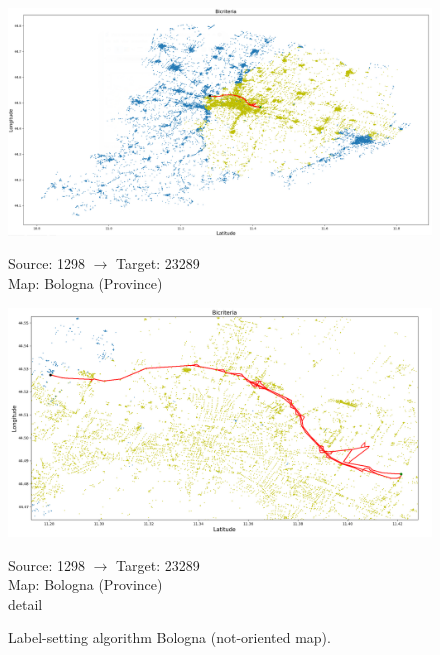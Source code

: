 \documentclass[a4paper,11pt]{report}
\begin{document}
\begin{figure}[H]
	\centering
	\begin{minipage}[b]{\textwidth}
		\includegraphics[width=\textwidth]{immaginiTest/BolognaBiC1298-23289Big.png}
		\label{fig:BolognaBiC1298-23289Big}
	\end{minipage}
	Source: 1298 $\to$ Target: 23289\\Map: Bologna (Province)
	\hfill
	\begin{minipage}[b]{\textwidth}
		\includegraphics[width=\textwidth]{immaginiTest/BolognaBiC1298-23289.png}
		\label{fig:BolognaBiC1298-23289}
	\end{minipage}
	Source: 1298 $\to$ Target: 23289\\Map: Bologna (Province)\\ detail
	\caption{Label-setting algorithm Bologna (not-oriented map).}
\end{figure}
\end{document}
